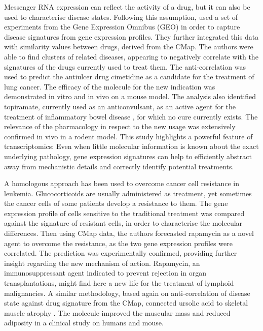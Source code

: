 Messenger RNA expression can reflect the activity of a drug, but it can also be used to characterise disease states. Following this assumption, \citep{sirota2011discovery} used a set of experiments from the Gene Expression Omnibus (GEO) in order to capture disease signatures from gene expression profiles. They further integrated this data with similarity values between drugs, derived from the CMap. The authors were able to find clusters of related diseases, appearing to negatively correlate with the signatures of the drugs currently used to treat them. The anti-correlation was used to predict the antiulcer drug cimetidine as a candidate for the treatment of lung cancer. The efficacy of the molecule for the new indication was demonstrated in vitro and in vivo on a mouse model. The analysis also identified topiramate, currently used as an anticonvulsant, as an active agent for the treatment of inflammatory bowel disease \citep{dudley2011computational}, for which no cure currently exists. The relevance of the pharmacology in respect to the new usage was extensively confirmed in vivo in a rodent model. This study highlights a powerful feature of transcriptomics: Even when little molecular information is known about the exact underlying pathology, gene expression signatures can help to efficiently abstract away from mechanistic details and correctly identify potential treatments.

A homologous approach has been used to overcome cancer cell resistance \cite{wei2006gene} in leukemia. Glucocorticoids are usually administered as treatment, yet sometimes the cancer cells of some patients develop a resistance to them. The gene expression profile of cells sensitive to the traditional treatment was compared against the signature of resistant cells, in order to characterise the molecular differences. Then using CMap data, the authors forecasted rapamycin as a novel agent to overcome the resistance, as the two gene expression profiles were correlated. The prediction was experimentally confirmed, providing further insight regarding the new mechanism of action. Rapamycin, an immunosuppressant agent indicated to prevent rejection in organ transplantations, might find here a new life for the treatment of lymphoid malignancies. A similar methodology, based again on anti-correlation of disease state against drug signature from the CMap, connected ursolic acid to skeletal muscle atrophy \citep{kunkel2011mrna}. The molecule improved the muscular mass and reduced adiposity in a clinical study on humans and mouse.

